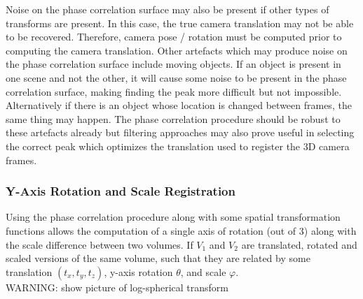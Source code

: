 Noise on the phase correlation surface may also be present if other types of transforms are present. In this case, the true camera translation may not be able to be recovered. Therefore, camera pose / rotation must be computed prior to computing the camera translation. Other artefacts which may produce noise on the phase correlation surface include moving objects. If an object is present in one scene and not the other, it will cause some noise to be present in the phase correlation surface, making finding the peak more difficult but not impossible. Alternatively if there is an object whose location is changed between frames, the same thing may happen. The phase correlation procedure should be robust to these artefacts already but filtering approaches may also prove useful in selecting the correct peak which optimizes the translation used to register the 3D camera frames. \\

\subsubsection{Y-Axis Rotation and Scale Registration}

Using the phase correlation procedure along with some spatial transformation functions allows the computation of a single axis of rotation (out of 3) along with the scale difference between two volumes. If $V_1$ and $V_2$ are translated, rotated and scaled versions of the same volume, such that they are related by some translation $(t_x, t_y, t_z)$, y-axis rotation $\theta$, and scale $\varphi$.\\


WARNING: show picture of log-spherical transform\\

